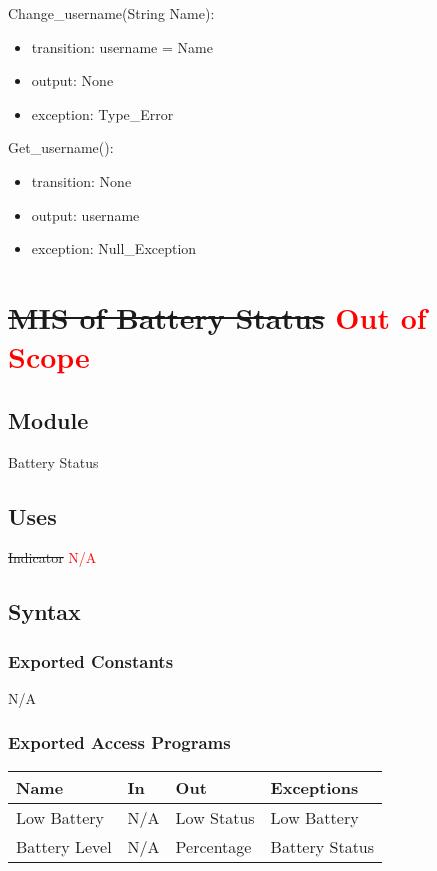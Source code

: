 \documentclass[12pt, titlepage]{article}
\begin{document}
\noindent Change\_username(String Name):
\begin{itemize}
\item transition: username = Name
\item output: None
\item exception: Type\_Error 
\end{itemize}

\noindent Get\_username():
\begin{itemize}
\item transition: None 
\item output: username
\item exception: Null\_Exception 
\end{itemize}

\newpage


\section{\sout{MIS of Battery Status} \textcolor{red}{Out of Scope}} \label{Module}

\subsection{Module}

Battery Status

\subsection{Uses}

\sout{Indicator} \textcolor{red}{N/A}

\subsection{Syntax}

\subsubsection{Exported Constants}

N/A

\subsubsection{Exported Access Programs}

\begin{center}
\begin{tabular}{p{2cm} p{4cm} p{4cm} p{2cm}}
\hline
\textbf{Name} & \textbf{In} & \textbf{Out} & \textbf{Exceptions} \\
\hline
Low Battery & N/A & Low Status & Low Battery \\
\hline
Battery Level & N/A & Percentage & Battery Status \\
\hline
\end{tabular}
\end{center}
\end{document}
